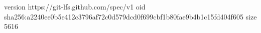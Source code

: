 version https://git-lfs.github.com/spec/v1
oid sha256:a2240ee0b5e412c3796af72c0d579dcd0f699cbf1b80fae9b4b1c15fd404f605
size 5616
